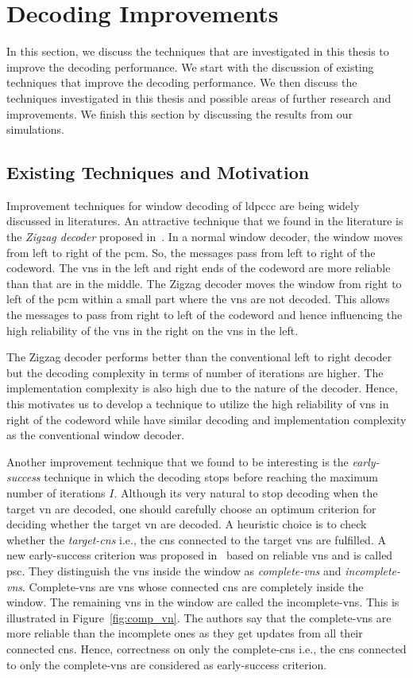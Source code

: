 \section{Decoding Improvements}\label{ch:dec_improve}
In this section, we discuss the techniques that are investigated in this thesis to improve the decoding performance. We start with the discussion of existing techniques that improve the decoding performance. We then discuss the techniques investigated in this thesis and possible areas of further research and improvements. We finish this section by discussing the results from our simulations.

\subsection{Existing Techniques and Motivation}
Improvement techniques for window decoding of \ac{ldpccc} are being widely discussed in literatures. An attractive technique that we found in the literature is the \emph{Zigzag decoder} proposed in~\cite{Shadi2015}. In a normal window decoder, the window moves from left to right of the \ac{pcm}. So, the messages pass from left to right of the codeword. The \acp{vn} in the left and right ends of the codeword are more reliable than that are in the middle. The Zigzag decoder moves the window from right to left of the \ac{pcm} within a small part where the \acp{vn} are not decoded. This allows the messages to pass from right to left of the codeword and hence influencing the high reliability of the \acp{vn} in the right on the \acp{vn} in the left.

The Zigzag decoder performs better than the conventional left to right decoder but the decoding complexity in terms of number of iterations are higher. The implementation complexity is also high due to the nature of the decoder. Hence, this motivates us to develop a technique to utilize the high reliability of \acp{vn} in right of the codeword while have similar decoding and implementation complexity as the conventional window decoder.

Another improvement technique that we found to be interesting is the \emph{early-success} technique in which the decoding stops before reaching the maximum number of iterations $I$. Although its very natural to stop decoding when the target \ac{vn} are decoded, one should carefully choose an optimum criterion for deciding whether the target \ac{vn} are decoded. A heuristic choice is to check whether the \emph{target-\acp{cn}} i.e., the \acp{cn} connected to the target \acp{vn} are fulfilled. A new early-success criterion was proposed in~\cite{Kang2018} based on reliable \acp{vn} and is called \ac{psc}. They distinguish the \acp{vn} inside the window as \emph{complete-\acp{vn}} and \emph{incomplete-\acp{vn}}. Complete-\acp{vn} are \acp{vn} whose connected \acp{cn} are completely inside the window. The remaining \acp{vn} in the window are called the incomplete-\acp{vn}. This is illustrated in Figure~\ref{fig:comp_vn}. The authors say that the complete-\acp{vn} are more reliable than the incomplete ones as they get updates from all their connected \acp{cn}. Hence, correctness on only the complete-\acp{cn} i.e., the \acp{cn} connected to only the complete-\acp{vn} are considered as early-success criterion.

